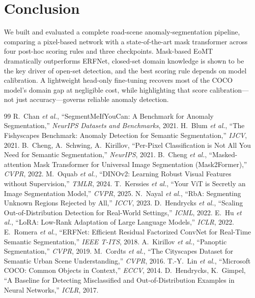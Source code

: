 \documentclass[10pt,twocolumn]{article}
\begin{document}
\section{Conclusion}
We built and evaluated a complete road-scene anomaly-segmentation pipeline,
comparing a pixel-based network with a state-of-the-art mask transformer across
four post-hoc scoring rules and three checkpoints. Mask-based EoMT dramatically
outperforms ERFNet, closed-set domain knowledge is shown to be the key driver of
open-set detection, and the best scoring rule depends on model calibration. A
lightweight head-only fine-tuning recovers most of the COCO model's domain gap at
negligible cost, while highlighting that score calibration---not just
accuracy---governs reliable anomaly detection.

\begin{thebibliography}{99}
\small
{} R.~Chan \emph{et al.},
``SegmentMeIfYouCan: A Benchmark for Anomaly Segmentation,'' \emph{NeurIPS Datasets and Benchmarks}, 2021.
 H.~Blum \emph{et al.},
``The Fishyscapes Benchmark: Anomaly Detection for Semantic Segmentation,'' \emph{IJCV}, 2021.
 B.~Cheng, A.~Schwing, A.~Kirillov,
``Per-Pixel Classification is Not All You Need for Semantic Segmentation,'' \emph{NeurIPS}, 2021.
 B.~Cheng \emph{et al.},
``Masked-attention Mask Transformer for Universal Image Segmentation (Mask2Former),'' \emph{CVPR}, 2022.
 M.~Oquab \emph{et al.},
``DINOv2: Learning Robust Visual Features without Supervision,'' \emph{TMLR}, 2024.
 T.~Kerssies \emph{et al.},
``Your ViT is Secretly an Image Segmentation Model,'' \emph{CVPR}, 2025.
 N.~Nayal \emph{et al.},
``RbA: Segmenting Unknown Regions Rejected by All,'' \emph{ICCV}, 2023.
 D.~Hendrycks \emph{et al.},
``Scaling Out-of-Distribution Detection for Real-World Settings,'' \emph{ICML}, 2022.
 E.~Hu \emph{et al.},
``LoRA: Low-Rank Adaptation of Large Language Models,'' \emph{ICLR}, 2022.
 E.~Romera \emph{et al.},
``ERFNet: Efficient Residual Factorized ConvNet for Real-Time Semantic Segmentation,'' \emph{IEEE T-ITS}, 2018.
 A.~Kirillov \emph{et al.},
``Panoptic Segmentation,'' \emph{CVPR}, 2019.
 M.~Cordts \emph{et al.},
``The Cityscapes Dataset for Semantic Urban Scene Understanding,'' \emph{CVPR}, 2016.
 T.-Y.~Lin \emph{et al.},
``Microsoft COCO: Common Objects in Context,'' \emph{ECCV}, 2014.
 D.~Hendrycks, K.~Gimpel,
``A Baseline for Detecting Misclassified and Out-of-Distribution Examples in Neural Networks,'' \emph{ICLR}, 2017.
\end{thebibliography}
\end{document}
